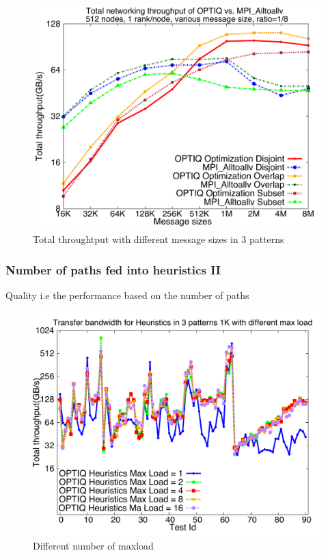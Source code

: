 \begin{figure}[!htb]
\vspace{-0.1in}
\centering
\includegraphics[scale=0.30]{figures/messagesize.pdf}
\vspace{-0.1in}
\caption{Total throughtput with different message sizes in 3 patterns}
\vspace{-0.1in}
\label{fig:messagesize}
\end{figure}

\subsubsection{Number of paths fed into heuristics II}

Quality i.e the performance based on the number of paths

\begin{figure}[!htb]
\vspace{-0.1in}
\centering
\includegraphics[scale=0.30]{figures/heu_paths.pdf}
\vspace{-0.1in}
\caption{Different number of maxload}
\vspace{-0.1in}
\label{fig:heu_paths}
\end{figure}


